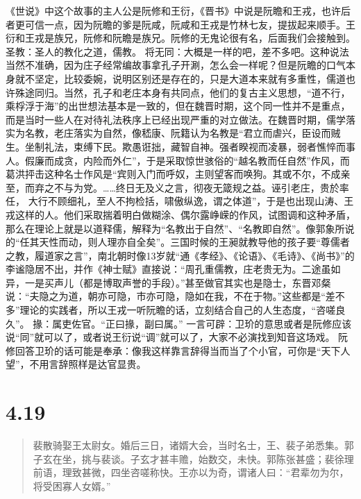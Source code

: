 \documentclass[]{book}
\begin{document}
《世说》中这个故事的主人公是阮修和王衍，《晋书》中说是阮瞻和王戎，也许后者更可信一点，因为阮瞻的爹是阮咸，阮咸和王戎是竹林七友，提拔起来顺手。王衍和王戎是族兄，阮修和阮瞻是族兄。阮修的无鬼论很有名，后面我们会接触到。
圣教：圣人的教化之道，儒教。
将无同：大概是一样的吧，差不多吧。这种说法当然不准确，因为庄子经常编故事拿孔子开涮，怎么会一样呢？但是阮瞻的口气本身就不坚定，比较委婉，说明区别还是存在的，只是大道本来就有多重性，儒道也许殊途同归。当然，孔子和老庄本身有共同点，他们的复古主义思想，``道不行，乘桴浮于海''的出世想法基本是一致的，但在魏晋时期，这个同一性并不是重点，而是当时一些人在对待礼法秩序上已经出现严重的对立做法。在魏晋时期，儒学落实为名教，老庄落实为自然，像嵇康、阮籍认为名教是``君立而虐兴，臣设而贼生。坐制礼法，束缚下民。欺愚诳拙，藏智自神。强者睽视而凌暴，弱者憔悴而事人。假廉而成贪，内险而外仁''，于是采取惊世骇俗的``越名教而任自然''作风，而葛洪抨击这种名士作风是``宾则入门而呼奴，主则望客而唤狗。其或不尔，不成亲至，而弃之不与为党。\ldots{}\ldots{}终日无及义之言，彻夜无箴规之益。诬引老庄，贵於率任，
大行不顾细礼，至人不拘检括，啸傲纵逸，谓之体道''，于是也出现山涛、王戎这样的人。他们采取揣着明白做糊涂、偶尔露峥嵘的作风，试图调和这种矛盾，那么在理论上就是以道释儒，解释为``名教出于自然''、``名教即自然''。像郭象所说的``任其天性而动，则人理亦自全矣''。三国时候的王昶就教导他的孩子要``尊儒者之教，履道家之言''，南北朝时像13岁就``通《孝经》、《论语》、《毛诗》、《尚书》''的李谧隐居不出，并作《神士赋》直接说：``周孔重儒教，庄老贵无为。二途虽如异，一是买声儿（都是博取声誉的手段）。''甚至做官其实也是隐士，东晋邓粲说：``夫隐之为道，朝亦可隐，市亦可隐，隐如在我，不在于物。''这些都是``差不多''理论的实践者，所以王戎一听阮瞻的话，立刻结合自己的人生态度，``咨嗟良久''。
掾：属吏佐官。``正曰掾，副曰属。''
一言可辟：卫玠的意思或者是阮修应该说``同''就可以了，或者说王衍说``调''就可以了，大家不必演找到知音这场戏。
阮修回答卫玠的话可能是奉承：像我这样靠言辞得当而当了个小官，可你是``天下人望''，不用言辞照样是达官显贵。

\section{4.19}\label{section-198}

\begin{quote}
裴散骑娶王太尉女。婚后三日，诸婿大会，当时名士，王、裴子弟悉集。郭子玄在坐，挑与裴谈。子玄才甚丰赡，始数交，未快。郭陈张甚盛；裴徐理前语，理致甚微，四坐咨嗟称快。王亦以为奇，谓诸人曰：``君辈勿为尔，将受困寡人女婿。''
\end{quote}
\end{document}

